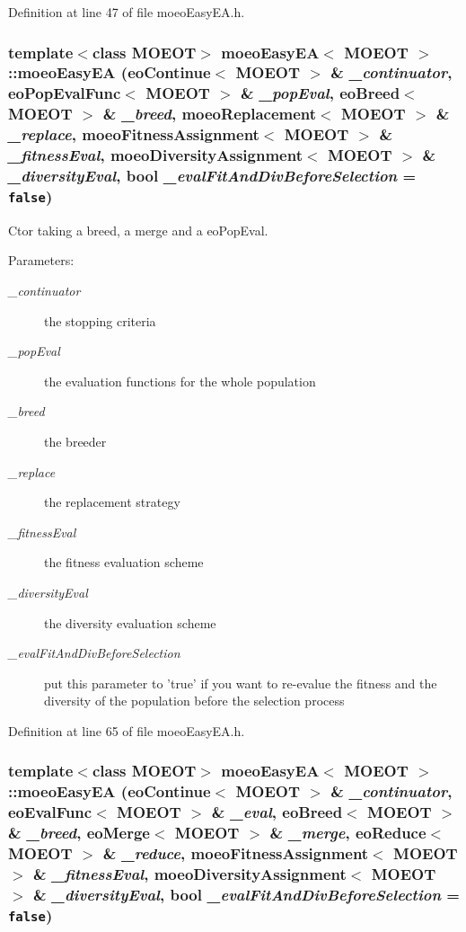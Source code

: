 Definition at line 47 of file moeo\-Easy\-EA.h.
\subsubsection{\setlength{\rightskip}{0pt plus 5cm}template$<$class MOEOT$>$ \bf{moeo\-Easy\-EA}$<$ MOEOT $>$::\bf{moeo\-Easy\-EA} (\bf{eo\-Continue}$<$ MOEOT $>$ \& {\em \_\-continuator}, \bf{eo\-Pop\-Eval\-Func}$<$ MOEOT $>$ \& {\em \_\-pop\-Eval}, \bf{eo\-Breed}$<$ MOEOT $>$ \& {\em \_\-breed}, \bf{moeo\-Replacement}$<$ MOEOT $>$ \& {\em \_\-replace}, \bf{moeo\-Fitness\-Assignment}$<$ MOEOT $>$ \& {\em \_\-fitness\-Eval}, \bf{moeo\-Diversity\-Assignment}$<$ MOEOT $>$ \& {\em \_\-diversity\-Eval}, bool {\em \_\-eval\-Fit\-And\-Div\-Before\-Selection} = {\tt false})\hspace{0.3cm}{\tt  [inline]}}\label{classmoeoEasyEA_6cdebc72ce0134ce1680dafdf94740a1}


Ctor taking a breed, a merge and a eo\-Pop\-Eval. 

\begin{Desc}
\item[Parameters:]
\begin{description}
\item[{\em \_\-continuator}]the stopping criteria \item[{\em \_\-pop\-Eval}]the evaluation functions for the whole population \item[{\em \_\-breed}]the breeder \item[{\em \_\-replace}]the replacement strategy \item[{\em \_\-fitness\-Eval}]the fitness evaluation scheme \item[{\em \_\-diversity\-Eval}]the diversity evaluation scheme \item[{\em \_\-eval\-Fit\-And\-Div\-Before\-Selection}]put this parameter to 'true' if you want to re-evalue the fitness and the diversity of the population before the selection process \end{description}
\end{Desc}


Definition at line 65 of file moeo\-Easy\-EA.h.
\subsubsection{\setlength{\rightskip}{0pt plus 5cm}template$<$class MOEOT$>$ \bf{moeo\-Easy\-EA}$<$ MOEOT $>$::\bf{moeo\-Easy\-EA} (\bf{eo\-Continue}$<$ MOEOT $>$ \& {\em \_\-continuator}, \bf{eo\-Eval\-Func}$<$ MOEOT $>$ \& {\em \_\-eval}, \bf{eo\-Breed}$<$ MOEOT $>$ \& {\em \_\-breed}, \bf{eo\-Merge}$<$ MOEOT $>$ \& {\em \_\-merge}, \bf{eo\-Reduce}$<$ MOEOT $>$ \& {\em \_\-reduce}, \bf{moeo\-Fitness\-Assignment}$<$ MOEOT $>$ \& {\em \_\-fitness\-Eval}, \bf{moeo\-Diversity\-Assignment}$<$ MOEOT $>$ \& {\em \_\-diversity\-Eval}, bool {\em \_\-eval\-Fit\-And\-Div\-Before\-Selection} = {\tt false})\hspace{0.3cm}{\tt  [inline]}}\label{classmoeoEasyEA_65c1069eeed979ca433e6caee3b5e942}


